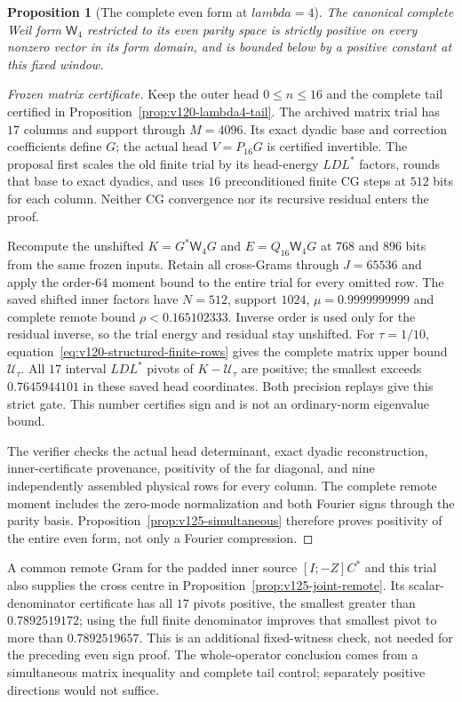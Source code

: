 \documentclass[11pt]{article}
\def\lambda{lambda}%
\newtheorem{proposition}[theorem]{Proposition}
\theoremstyle{remark}
\begin{document}
\begin{proposition}[The complete even form at $\lambda=4$]
\label{prop:v125-even-complete}
The canonical complete Weil form $\mathsf W_4$ restricted to its
even parity space is strictly positive on every nonzero vector
in its form domain, and is bounded below by a positive constant
at this fixed window.
\end{proposition}
\begin{proof}[Frozen matrix certificate]
Keep the outer head $0\le n\le16$ and the complete tail certified
in Proposition~\ref{prop:v120-lambda4-tail}.  The archived matrix
trial has $17$ columns and support through $M=4096$.  Its exact
dyadic base and correction coefficients define $G$; the actual
head $V=P_{16}G$ is certified invertible.  The proposal first scales
the old finite trial by its head-energy $LDL^*$ factors, rounds
that base to exact dyadics, and uses $16$ preconditioned finite CG
steps at $512$ bits for each column.  Neither CG convergence nor
its recursive residual enters the proof.

Recompute the unshifted $K=G^*\mathsf W_4G$ and
$E=Q_{16}\mathsf W_4G$ at $768$ and $896$ bits from the same
frozen inputs.  Retain all cross-Grams through $J=65536$ and apply
the order-$64$ moment bound to the entire trial for every omitted
row.  The saved shifted inner factors have $N=512$, support $1024$,
$\mu=0.9999999999$ and complete remote bound
$\rho<0.165102333$.  Inverse order is used only for the residual
inverse, so the trial energy and residual stay unshifted.
For $\tau=1/10$, equation~\eqref{eq:v120-structured-finite-rows}
gives the complete matrix upper bound $\mathcal U_\tau$.
All $17$ interval $LDL^*$ pivots of $K-\mathcal U_\tau$ are positive;
the smallest exceeds $0.7645944101$ in these saved head coordinates.
Both precision replays give this strict gate.  This number certifies
sign and is not an ordinary-norm eigenvalue bound.

The verifier checks the actual head determinant, exact dyadic
reconstruction, inner-certificate provenance, positivity of the
far diagonal, and nine independently assembled physical rows for
every column.  The complete remote moment includes the zero-mode
normalization and both Fourier signs through the parity basis.
Proposition~\ref{prop:v125-simultaneous} therefore proves positivity
of the entire even form, not only a Fourier compression.
\end{proof}

A common remote Gram for the padded inner source $[I;-Z]C^*$ and
this trial also supplies the cross centre in
Proposition~\ref{prop:v125-joint-remote}.  Its scalar-denominator
certificate has all $17$ pivots positive, the smallest greater than
$0.7892519172$; using the full finite denominator improves that
smallest pivot to more than $0.7892519657$.  This is an additional
fixed-witness check, not needed for the preceding even sign proof.
The whole-operator conclusion comes from a simultaneous matrix
inequality and complete tail control; separately positive directions
would not suffice.
\end{document}

